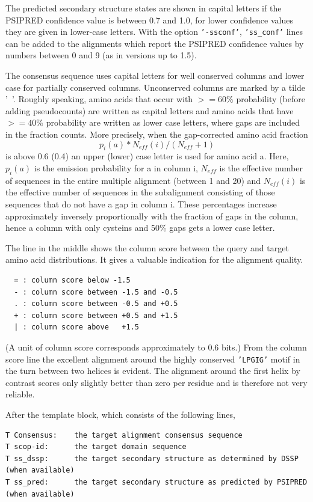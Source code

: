 \documentclass[11pt,a4paper]{article}
\begin{document}
The predicted secondary structure states are shown in capital letters if the PSIPRED
confidence value is between 0.7 and 1.0, for lower confidence values they are given 
in lower-case letters. With the option {\tt '-ssconf'}, {\tt 'ss\_conf'} lines can 
be added to the alignments which report the PSIPRED confidence values by numbers 
between 0 and 9 (as in versions up to 1.5).

The consensus sequence uses capital letters for well conserved columns and
lower case for partially conserved columns. Unconserved columns are marked by 
a tilde '~'. Roughly speaking, amino acids that occur with $>=60\%$ probability 
(before adding pseudocounts) are written as capital letters and amino acids that have 
$>=40\%$ probability are written as lower case letters, where gaps are included
in the fraction counts. More precisely, when the gap-corrected amino acid fraction
    \[p_i(a)*N_{eff}(i)/(N_{eff}+1)\]
is above 0.6 (0.4) an upper (lower) case letter is used for amino acid a.
Here, $p_i(a)$ is the emission probability for a in column i, $N_{eff}$ is the effective 
number of sequences in the entire multiple alignment (between 1 and 20) and $N_{eff}(i)$ is 
the effective number of sequences in the subalignment consisting of those sequences
that do not have a gap in column i. These percentages increase
approximately inversely proportionally with the fraction of gaps in the column, 
hence a column with only cysteins and 50\% gaps gets a lower case letter.
              
The line in the middle shows the column score between the query and target 
amino acid distributions. It gives a valuable indication for the alignment quality.
\small\begin{verbatim}
  = : column score below -1.5
  - : column score between -1.5 and -0.5
  . : column score between -0.5 and +0.5
  + : column score between +0.5 and +1.5
  | : column score above   +1.5
\end{verbatim}\normalsize

(A unit of column score corresponds approximately to 0.6 bits.)
From the column score line the excellent alignment around the highly conserved 
{\tt 'LPGIG'} motif in the turn between two helices is evident. The alignment around the 
first helix by contrast scores only slightly better than zero per residue and is
therefore not very reliable.

After the template block, which consists of the following lines, 
\small 
\begin{verbatim}
T Consensus:    the target alignment consensus sequence
T scop-id:      the target domain sequence
T ss_dssp:      the target secondary structure as determined by DSSP (when available)
T ss_pred:      the target secondary structure as predicted by PSIPRED (when available)
\end{verbatim}\normalsize
\end{document}

